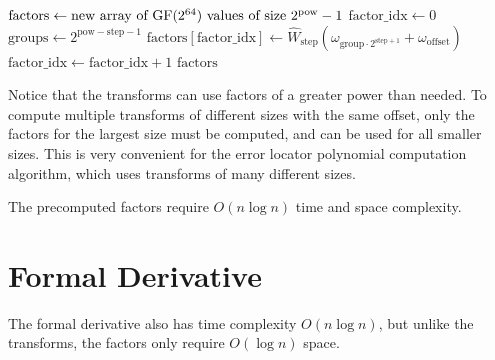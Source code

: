 \begin{algorithm}[!htb]
    \begin{algorithmic}
            \State $\text{factors} \gets \text{new array of $\text{GF}(2^{64})$ values of size } 2^{\text{pow}} - 1$
            \State $\text{factor\_idx} \gets 0$
                \State $\text{groups} \gets 2^{\text{pow} - \text{step} - 1}$
                    \State $\text{factors}[\text{factor\_idx}] \gets \hat{W}_{\text{step}}(\omega_{\text{group} \cdot 2^{\text{step} + 1}} + \omega_{\text{offset}})$
                    \State $\text{factor\_idx} \gets \text{factor\_idx} + 1$
                \EndFor
            \EndFor
            \State \Return $\text{factors}$
        \EndFunction
    \end{algorithmic}
\end{algorithm}

Notice that the transforms can use factors of a greater power than needed. To compute multiple transforms of different sizes with the same offset, only the factors for the largest size must be computed, and can be used for all smaller sizes.
This is very convenient for the error locator polynomial computation algorithm, which uses transforms of many different sizes.

The precomputed factors require $O(n \log n)$ time and space complexity.

\section{Formal Derivative}
\label{appendix:derivative}

The formal derivative also has time complexity $O(n \log n)$, but unlike the transforms, the factors only require $O(\log n)$ space.

